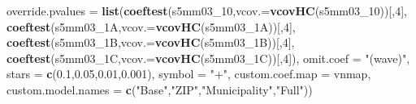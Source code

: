 \documentclass[
]{article}
\newenvironment{Shaded}{\begin{snugshade}}{\end{snugshade}}
\newcommand{\DataTypeTok}[1]{\textcolor[rgb]{0.13,0.29,0.53}{#1}}
\newcommand{\DecValTok}[1]{\textcolor[rgb]{0.00,0.00,0.81}{#1}}
\newcommand{\FloatTok}[1]{\textcolor[rgb]{0.00,0.00,0.81}{#1}}
\newcommand{\KeywordTok}[1]{\textcolor[rgb]{0.13,0.29,0.53}{\textbf{#1}}}
\newcommand{\NormalTok}[1]{#1}
\newcommand{\StringTok}[1]{\textcolor[rgb]{0.31,0.60,0.02}{#1}}
\begin{document}
\begin{Shaded}
\begin{Highlighting}[]
          \DataTypeTok{override.pvalues =} \KeywordTok{list}\NormalTok{(}\KeywordTok{coeftest}\NormalTok{(s5mm03_}\DecValTok{10}\NormalTok{,}\DataTypeTok{vcov.=}\KeywordTok{vcovHC}\NormalTok{(s5mm03_}\DecValTok{10}\NormalTok{))[,}\DecValTok{4}\NormalTok{],}
                                  \KeywordTok{coeftest}\NormalTok{(s5mm03_1A,}\DataTypeTok{vcov.=}\KeywordTok{vcovHC}\NormalTok{(s5mm03_1A))[,}\DecValTok{4}\NormalTok{],}
                                  \KeywordTok{coeftest}\NormalTok{(s5mm03_1B,}\DataTypeTok{vcov.=}\KeywordTok{vcovHC}\NormalTok{(s5mm03_1B))[,}\DecValTok{4}\NormalTok{],}
                                  \KeywordTok{coeftest}\NormalTok{(s5mm03_1C,}\DataTypeTok{vcov.=}\KeywordTok{vcovHC}\NormalTok{(s5mm03_1C))[,}\DecValTok{4}\NormalTok{]),}
          \DataTypeTok{omit.coef =} \StringTok{"(wave)"}\NormalTok{, }\DataTypeTok{stars =} \KeywordTok{c}\NormalTok{(}\FloatTok{0.1}\NormalTok{,}\FloatTok{0.05}\NormalTok{,}\FloatTok{0.01}\NormalTok{,}\FloatTok{0.001}\NormalTok{), }\DataTypeTok{symbol =} \StringTok{"+"}\NormalTok{,}
          \DataTypeTok{custom.coef.map =}\NormalTok{ vnmap, }
          \DataTypeTok{custom.model.names =} \KeywordTok{c}\NormalTok{(}\StringTok{"Base"}\NormalTok{,}\StringTok{"ZIP"}\NormalTok{,}\StringTok{"Municipality"}\NormalTok{,}\StringTok{"Full"}\NormalTok{))}
\end{Highlighting}
\end{Shaded}
\end{document}
